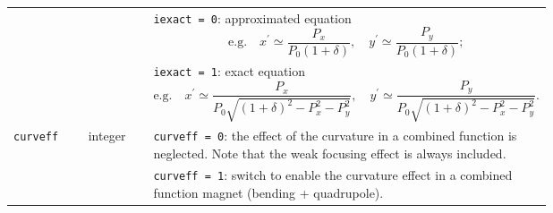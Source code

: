 \begin{longtabu}{@{}llp{0.7\linewidth}}
                           &          & \texttt{iexact = 0}: approximated equation
                           \begin{equation*}
                                \mbox{e.g.}
                                \quad x^\prime \simeq \frac{P_x}{P_0(1+\delta)},
                                \quad y^\prime \simeq \frac{P_y}{P_0(1+\delta)};
                           \end{equation*} \\
                           &          & \texttt{iexact = 1}: exact equation
                           \begin{equation*}
                                \mbox{e.g.}
                                \quad x^\prime \simeq \frac{P_x}{P_0\sqrt{(1+\delta)^2-P_x^2-P_y^2}},
                                \quad y^\prime \simeq \frac{P_y}{P_0\sqrt{(1+\delta)^2-P_x^2-P_y^2}}.
                           \end{equation*} \\
    \texttt{curveff}       & integer  & \texttt{curveff = 0}: the effect of the curvature in a combined function is neglected. Note that the weak focusing effect is always included. \\
                           &          & \texttt{curveff = 1}: switch to enable the curvature effect in a combined function magnet (bending + quadrupole).
\end{longtabu}

